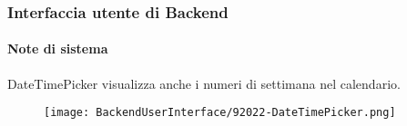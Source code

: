 %

\begin{frame}[fragile]
	\frametitle{Interfaccia utente di Backend}
	\framesubtitle{Note di sistema}

	DateTimePicker visualizza anche i numeri di settimana nel calendario.

	\begin{figure}
		\texttt{[image: BackendUserInterface/92022-DateTimePicker.png]}
	\end{figure}

\end{frame}

